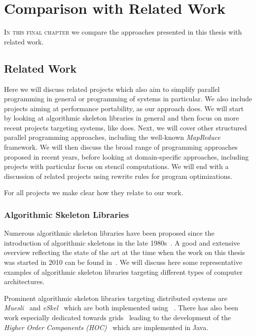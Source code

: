 
\chapter{Comparison with Related Work}

\label{ch:eighth} %

\lettrine[lines=3, loversize=0.1]{I}{n this final chapter} we compare the approaches presented in this thesis with related work.

\section{Related Work}
Here we will discuss related projects which also aim to simplify parallel programming in general or programming of \GPU systems in particular.
We also include projects aiming at performance portability, as our approach does.
We will start by looking at algorithmic skeleton libraries in general and then focus on more recent projects targeting \GPU systems, like \SkelCL does.
Next, we will cover other structured parallel programming approaches, including the well-known \emph{MapReduce} framework.
We will then discuss the broad range of \GPU programming approaches proposed in recent years, before looking at domain-specific approaches, including projects with particular focus on stencil computations.
We will end with a discussion of related projects using rewrite rules for program optimizations.

For all projects we make clear how they relate to our work.


\subsection{Algorithmic Skeleton Libraries}
Numerous algorithmic skeleton libraries have been proposed since the introduction of algorithmic skeletons in the late 1980s~\cite{Cole1991}.
A good and extensive overview reflecting the state of the art at the time when the work on this thesis was started in 2010 can be found in~\cite{Gonzalez-VelezL10}.
We will discuss here some representative examples of algorithmic skeleton libraries targeting different types of computer architectures.

Prominent algorithmic skeleton libraries targeting distributed systems are \emph{Muesli}~\cite{Kuchen02} and \emph{eSkel}~\cite{Cole04} which are both implemented using \MPI~\cite{MPI}.
There has also been work especially dedicated towards grids~\cite{AltG03a, Alt2007} leading to the development of the \emph{Higher Order Components ({\small HOC})}~\cite{DunnweberG04,DuennweberG09} which are implemented in Java.

